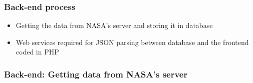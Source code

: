 \begin{frame}
\frametitle{Back-end process}

   \begin{itemize}
       \item Getting the data from NASA's server and storing it in database
       \item Web services required for JSON parsing between database and the frontend coded in PHP
   \end{itemize}
\end{frame}


\begin{frame}
\frametitle{Back-end: Getting data from NASA's server}

   
\end{frame}